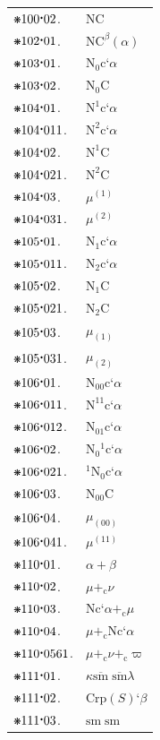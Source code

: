 \documentclass[12pt,openany,leqno,twocolumn]{book}
\newcommand{\pmast}{\text{\resizebox{!}{.75\height}{\ding{107}}}} %
\newcommand{\pmcdot}{\text{\raisebox{.05cm}{$\boldsymbol\cdot$}}} %
\newcommand{\pmnc}[1]{\text{Nc}\textbf{`}#1} %
\newcommand{\pmNC}{\text{NC}} %
\newcommand{\pmNCat}[2]{\text{NC}^{#1}({#2})} %
\newcommand{\pmnoc}[1]{\text{N}_0\text{c}\textbf{`}#1} %
\newcommand{\pmNoC}{\text{N}_0\text{C}} %
\newcommand{\pmnca}[2]{\text{N}^{#1}\text{c}\textbf{`}#2} %
\newcommand{\pmNca}[1]{\text{N}^{#1}\text{C}} %
\newcommand{\pmch}[2]{#1^{(#2)}} %
\newcommand{\pmncd}[2]{\text{N}_{#1}\text{c}\textbf{`}#2} %
\newcommand{\pmNcd}[1]{\text{N}_{#1}\text{C}} %
\newcommand{\pmcl}[2]{#1_{(#2)}} %
\newcommand{\pmncll}[3]{\text{N}_{#1#2}\text{c}\textbf{`}#3} %
\newcommand{\pmnchh}[3]{\text{N}^{#1#2}\text{c}\textbf{`}#3} %
\newcommand{\pmncaa}[3]{\text{N}_{#1}{}^{#2}\text{c}\textbf{`}#3} %
\newcommand{\pmncdd}[3]{{}^{#1}\text{N}_{#2}\text{c}\textbf{`}#3} %
\newcommand{\pmNCll}[2]{\text{N}_{#1#2}\text{C}} %
\newcommand{\pmcll}[3]{#1_{(#2#3)}} %
\newcommand{\pmchh}[3]{#1^{(#2#3)}} %
\newcommand{\pmarsumc}{\mathrel{+}} %
\newcommand{\pmarsumnc}{\mathrel{{+}_{\text{c}}}} %
\newcommand{\pmsmsmb}{\mathrel{\overline{\text{sm}}\;\overline{\text{sm}}}} %
\newcommand{\pmcrp}[2]{\text{Crp}(#1)\textbf{`}#2} %
\newcommand{\pmsmsm}{\mathrel{\text{sm}\;\text{sm}}} %
\begin{document}
\onehalfspacing
\begin{tabular}{l l}
	$\pmast100\pmcdot02$. & $\pmNC$ \\
	$\pmast102\pmcdot01$. & $\pmNCat{\beta}{\alpha}$ \\
	$\pmast103\pmcdot01$. & $\pmnoc{\alpha}$ \\
	$\pmast103\pmcdot02$. & $\pmNoC$ \\
	$\pmast104\pmcdot01$. & $\pmnca{1}{\alpha}$ \\
	$\pmast104\pmcdot011$. & $\pmnca{2}{\alpha}$ \\
	$\pmast104\pmcdot02$. & $\pmNca{1}$ \\
	$\pmast104\pmcdot021$. & $\pmNca{2}$ \\
	$\pmast104\pmcdot03$. & $\pmch{\mu}{1}$ \\
	$\pmast104\pmcdot031$. & $\pmch{\mu}{2}$ \\
	$\pmast105\pmcdot01$. & $\pmncd{1}{\alpha}$ \\
	$\pmast105\pmcdot011$. & $\pmncd{2}{\alpha}$ \\
	$\pmast105\pmcdot02$. & $\pmNcd{1}$ \\
	$\pmast105\pmcdot021$. & $\pmNcd{2}$ \\
	$\pmast105\pmcdot03$. & $\pmcl{\mu}{1}$ \\
	$\pmast105\pmcdot031$. & $\pmcl{\mu}{2}$ \\
	$\pmast106\pmcdot01$. & $\pmncll{0}{0}{\alpha}$ \\
	$\pmast106\pmcdot011$. & $\pmnchh{1}{1}{\alpha}$ \\
	$\pmast106\pmcdot012$. & $\pmncll{0}{1}{\alpha}$ \\
	$\pmast106\pmcdot02$. & $\pmncaa{0}{1}{\alpha}$ \\
	$\pmast106\pmcdot021$. & $\pmncdd{1}{0}{\alpha}$ \\
	$\pmast106\pmcdot03$. & $\pmNCll{0}{0}$ \\
	$\pmast106\pmcdot04$. & $\pmcll{\mu}{0}{0}$ \\
	$\pmast106\pmcdot041$. & $\pmchh{\mu}{1}{1}$ \\
	$\pmast110\pmcdot01$. & $\alpha \pmarsumc \beta$ \\
	$\pmast110\pmcdot02$. & $\mu \pmarsumnc \nu$ \\
	$\pmast110\pmcdot03$. & $\pmnc{\alpha} \pmarsumnc \mu$ \\
	$\pmast110\pmcdot04$. & $\mu \pmarsumnc \pmnc{\alpha}$ \\
	$\pmast110\pmcdot0561$. & $\mu \pmarsumnc \nu \pmarsumnc \varpi$ \\
	$\pmast111\pmcdot01$. & $\kappa \pmsmsmb \lambda$ \\
	$\pmast111\pmcdot02$. & $\pmcrp{S}{\beta}$ \\
	$\pmast111\pmcdot03$. & $\pmsmsm$ 
\end{tabular}
\end{document}
